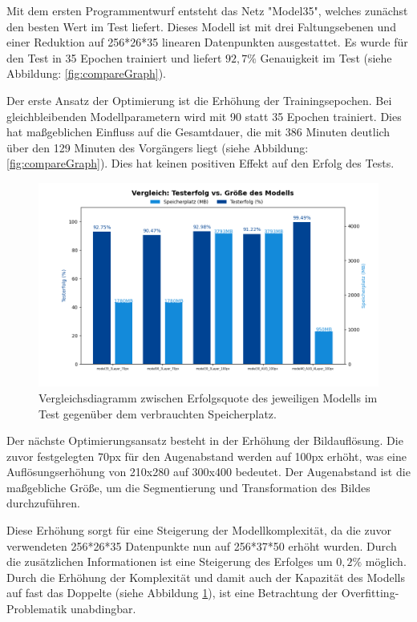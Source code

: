 \documentclass[journal,twoside,web]{ieeecolor}
\begin{document}
Mit dem ersten Programmentwurf entsteht das Netz "Model35", welches zunächst den besten Wert im Test liefert. Dieses Modell ist mit drei Faltungsebenen und einer Reduktion auf 256*26*35 linearen Datenpunkten ausgestattet.
Es wurde für den Test in 35 Epochen trainiert und liefert $92,7\%$ Genauigkeit im Test (siehe Abbildung: \ref{fig:compareGraph}).

Der erste Ansatz der Optimierung ist die Erhöhung der Trainingsepochen. Bei gleichbleibenden Modellparametern wird mit 90 statt 35 Epochen trainiert.
Dies hat maßgeblichen Einfluss auf die Gesamtdauer, die mit 386 Minuten deutlich über den 129 Minuten des Vorgängers liegt (siehe Abbildung: \ref{fig:compareGraph}). Dies hat keinen positiven Effekt auf den Erfolg des Tests.

\begin{figure}[H]
    \centerline{\includegraphics[width=\columnwidth]{Erfolg_Groesse.png}}
    \caption{Vergleichsdiagramm zwischen Erfolgsquote des jeweiligen Modells im Test gegenüber dem verbrauchten Speicherplatz.}
    \label{fig:compareSize}
\end{figure}

Der nächste Optimierungsansatz besteht in der Erhöhung der Bildauflösung. Die zuvor festgelegten 70px für den Augenabstand werden auf 100px erhöht, was eine Auflösungserhöhung von 210x280 auf 300x400 bedeutet.
Der Augenabstand ist die maßgebliche Größe, um die Segmentierung und Transformation des Bildes durchzuführen.

Diese Erhöhung sorgt für eine Steigerung der Modellkomplexität, da die zuvor verwendeten 256*26*35 Datenpunkte nun auf 256*37*50 erhöht wurden. 
Durch die zusätzlichen Informationen ist eine Steigerung des Erfolges um $0,2\%$ möglich. Durch die Erhöhung der Komplexität und damit auch der Kapazität des Modells auf fast das Doppelte (siehe Abbildung \ref{fig:compareSize}), ist eine Betrachtung der Overfitting-Problematik unabdingbar.
\end{document}

